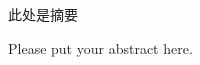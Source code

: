 
\begin{cabstract}
此处是摘要
\end{cabstract}


\begin{eabstract}
Please put your abstract here.
\end{eabstract}